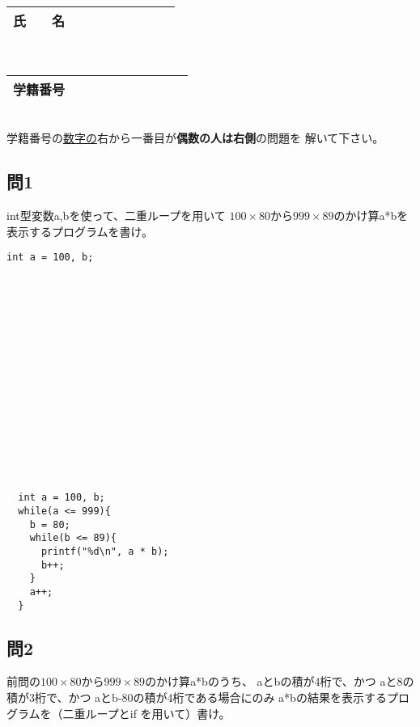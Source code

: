 \documentclass[a4j]{jarticle}
\begin{document}
\begin{multicols*}{2}






\noindent
\begin{tabular}[t]{|c|cccccccc|}\hline
氏　　名 & & & & & & & & \\ \hline
\end{tabular}\\
\begin{tabular}[t]{|c|c|c|c|c|c|c|c|c|c|}\hline
学籍番号 & & & & & & & & \\ \hline
\end{tabular}\\
学籍番号の\underline{数字の}右から一番目が{\bfseries 偶数の人は右側}の問題を
解いて下さい。
\vspace{-5ex}





\subsection*{問1}




{\ttfamily int型変数a,b}を使って、二重ループを用いて
$100\times80$から$999\times89$のかけ算{\ttfamily a*b}を表示するプログラムを書け。

\ifnum {}
\begin{verbatim}
int a = 100, b;

















\end{verbatim}
\else
\begin{verbatim}
  int a = 100, b;
  while(a <= 999){
    b = 80;
    while(b <= 89){
      printf("%d\n", a * b);
      b++;
    }
    a++;
  }
\end{verbatim}
\vspace{2cm}
\fi



\subsection*{問2}

前問の$100\times80$から$999\times89$のかけ算{\ttfamily a*b}のうち、
{\ttfamily aとb}の積が4桁で、かつ
{\ttfamily aと8}の積が3桁で、かつ
{\ttfamily aとb-80}の積が4桁である場合にのみ
{\ttfamily a*b}の結果を表示するプログラムを（二重ループと{\ttfamily if}
を用いて）書け。




\end{multicols*}
\end{document}
